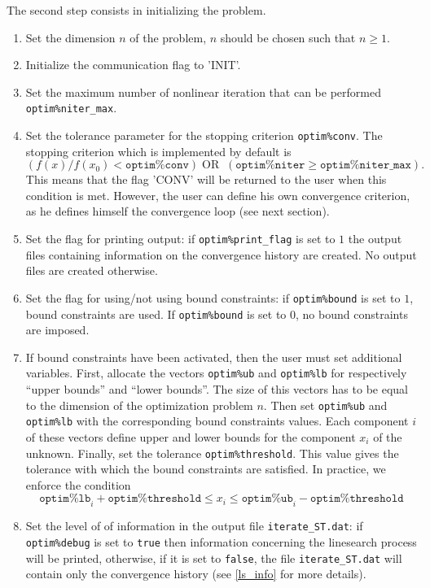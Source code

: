 \documentclass[a4paper,twoside,final,onecolumn,11pt,openright]{article}
\begin{document}
The second step consists in initializing the problem.
\begin{enumerate}
 \item Set the dimension $n$ of the problem, $n$ should be chosen such that $n\geq1$.
 \item Initialize the communication flag to 'INIT'.
 \item Set the maximum number of nonlinear iteration that can be performed \texttt{optim\%niter\_max}.
 \item Set the tolerance parameter for the stopping criterion \texttt{optim\%conv}. The stopping criterion which is implemented by default is 
\begin{equation}
 \left(f(x)/f(x_0)< \texttt{optim\%conv}\right) \; \textrm{OR} \;\;  \left(\texttt{optim\%niter}\geq\texttt{optim\%niter\_max}\right).
\end{equation}
This means that the flag 'CONV' will be returned to the user when this condition is met. However, the user can define his own convergence criterion, as he defines himself the convergence loop (see next section). 
\item Set the flag for printing output: if \texttt{optim\%print\_flag} is set to $1$ the output files containing information on the convergence history are created. No output files are created otherwise.
\item Set the flag for using/not using bound constraints: if \texttt{optim\%bound} is set to $1$, bound constraints are used. If  \texttt{optim\%bound} is set to $0$, no bound constraints are imposed.
\item If bound constraints have been activated, then the user must set additional variables. First, allocate the vectors \texttt{optim\%ub} and \texttt{optim\%lb} for respectively ``upper bounds'' and ``lower bounds''. The size of this vectors has to be equal to the dimension of the optimization problem $n$. Then set \texttt{optim\%ub} and \texttt{optim\%lb} with the corresponding bound constraints values. Each component $i$ of these vectors define upper and lower bounds for the component $x_i$ of the unknown. Finally, set the tolerance \texttt{optim\%threshold}. This value gives the tolerance with which the bound constraints are satisfied. In practice, we enforce the condition
\begin{equation}
 \texttt{optim\%lb}_i + \texttt{optim\%threshold} \leq x_i \leq \texttt{optim\%ub}_i - \texttt{optim\%threshold}
\end{equation}
 \item Set the level of of information in the output file \texttt{iterate\_ST.dat}: if \texttt{optim\%debug} is set to \texttt{true} then information concerning the linesearch process will be printed, otherwise, if it is set to \texttt{false}, the file \texttt{iterate\_ST.dat} will contain only the convergence history (see \ref{ls_info} for more details).

\end{enumerate}
\end{document}
